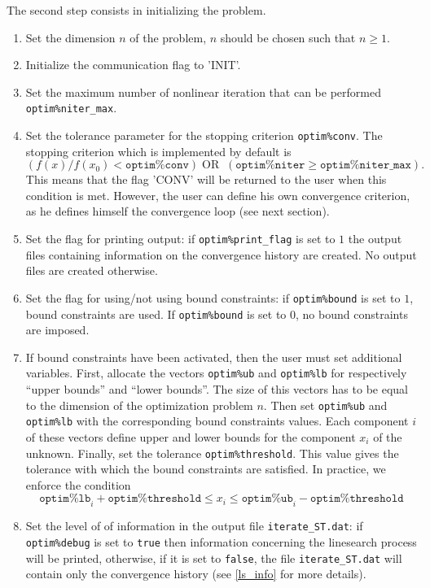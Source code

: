 \documentclass[a4paper,twoside,final,onecolumn,11pt,openright]{article}
\begin{document}
The second step consists in initializing the problem.
\begin{enumerate}
 \item Set the dimension $n$ of the problem, $n$ should be chosen such that $n\geq1$.
 \item Initialize the communication flag to 'INIT'.
 \item Set the maximum number of nonlinear iteration that can be performed \texttt{optim\%niter\_max}.
 \item Set the tolerance parameter for the stopping criterion \texttt{optim\%conv}. The stopping criterion which is implemented by default is 
\begin{equation}
 \left(f(x)/f(x_0)< \texttt{optim\%conv}\right) \; \textrm{OR} \;\;  \left(\texttt{optim\%niter}\geq\texttt{optim\%niter\_max}\right).
\end{equation}
This means that the flag 'CONV' will be returned to the user when this condition is met. However, the user can define his own convergence criterion, as he defines himself the convergence loop (see next section). 
\item Set the flag for printing output: if \texttt{optim\%print\_flag} is set to $1$ the output files containing information on the convergence history are created. No output files are created otherwise.
\item Set the flag for using/not using bound constraints: if \texttt{optim\%bound} is set to $1$, bound constraints are used. If  \texttt{optim\%bound} is set to $0$, no bound constraints are imposed.
\item If bound constraints have been activated, then the user must set additional variables. First, allocate the vectors \texttt{optim\%ub} and \texttt{optim\%lb} for respectively ``upper bounds'' and ``lower bounds''. The size of this vectors has to be equal to the dimension of the optimization problem $n$. Then set \texttt{optim\%ub} and \texttt{optim\%lb} with the corresponding bound constraints values. Each component $i$ of these vectors define upper and lower bounds for the component $x_i$ of the unknown. Finally, set the tolerance \texttt{optim\%threshold}. This value gives the tolerance with which the bound constraints are satisfied. In practice, we enforce the condition
\begin{equation}
 \texttt{optim\%lb}_i + \texttt{optim\%threshold} \leq x_i \leq \texttt{optim\%ub}_i - \texttt{optim\%threshold}
\end{equation}
 \item Set the level of of information in the output file \texttt{iterate\_ST.dat}: if \texttt{optim\%debug} is set to \texttt{true} then information concerning the linesearch process will be printed, otherwise, if it is set to \texttt{false}, the file \texttt{iterate\_ST.dat} will contain only the convergence history (see \ref{ls_info} for more details).

\end{enumerate}
\end{document}
